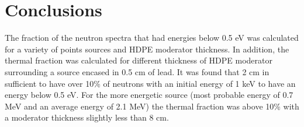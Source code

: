 \documentclass[final,onecolumn]{IEEEtran}
\begin{document}



\section{Conclusions}
The fraction of the neutron spectra that had energies below 0.5 eV was calculated for a variety of points sources and HDPE moderator thickness.
In addition, the thermal fraction was calculated for different thickness of HDPE moderator surrounding a  source encased in 0.5 cm of lead.
It was found that 2 cm in sufficient to have over 10\% of neutrons with an initial energy of 1 keV to have an energy below 0.5 eV.
For the more energetic  source (most probable energy of 0.7 MeV and an average energy of 2.1 MeV) the thermal fraction was above 10\% with a moderator thickness slightly less than 8 cm.


\pagebreak
\appendix

%
%
\end{document}
